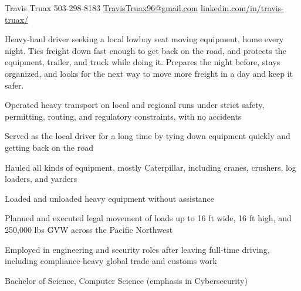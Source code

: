 \documentclass[10pt]{article}
\begin{document}
\titlebar
  {Travis Truax}
  {503-298-8183 \textbar{} \href{mailto:TravisTruax96@gmail.com}{TravisTruax96@gmail.com} \textbar{} \href{https://linkedin.com/in/travis-truax/}{linkedin.com/in/travis-truax/}}

Heavy-haul driver seeking a local lowboy seat moving equipment, home every night. Ties freight down fast enough to get back on the road, and protects the equipment, trailer, and truck while doing it. Prepares the night before, stays organized, and looks for the next way to move more freight in a day and keep it safer.


\begin{entryitems}
  \item Operated heavy transport on local and regional runs under strict safety, permitting, routing, and regulatory constraints, with no accidents
  \item Served as the local driver for a long time by tying down equipment quickly and getting back on the road
  \item Hauled all kinds of equipment, mostly Caterpillar, including cranes, crushers, log loaders, and yarders
  \item Loaded and unloaded heavy equipment without assistance
  \item Planned and executed legal movement of loads up to 16 ft wide, 16 ft high, and 250,000 lbs GVW across the Pacific Northwest
\end{entryitems}

\begin{entryitems}
  \item Employed in engineering and security roles after leaving full-time driving, including compliance-heavy global trade and customs work
\end{entryitems}

\begin{entryitems}
  \item Bachelor of Science, Computer Science (emphasis in Cybersecurity)
\end{entryitems}
\end{document}
